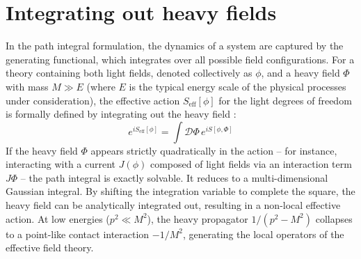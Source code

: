 \section{Integrating out heavy fields}\label{sec:intoutHDOF}
In the path integral formulation, the dynamics of a system are captured by the generating functional, which integrates over all possible field configurations. For a theory containing both light fields, denoted collectively as $\phi$, and a heavy field $\Phi$ with mass $M \gg E$ (where $E$ is the typical energy scale of the physical processes under consideration), the effective action $S_{\text{eff}}[\phi]$ for the light degrees of freedom is formally defined by integrating out the heavy field \cite{Donoghue:1992dd}:
\begin{equation}
    e^{i S_{\text{eff}}[\phi]} = \int \mathcal{D}\Phi \, e^{i S[\phi, \Phi]}
\end{equation}
If the heavy field $\Phi$ appears strictly quadratically in the action -- for instance, interacting with a current $J(\phi)$ composed of light fields via an interaction term $J \Phi$ -- the path integral is exactly solvable. It reduces to a multi-dimensional Gaussian integral. By shifting the integration variable to complete the square, the heavy field can be analytically integrated out, resulting in a non-local effective action. At low energies ($p^2 \ll M^2$), the heavy propagator $1/(p^2 - M^2)$ collapses to a point-like contact interaction $-1/M^2$, generating the local operators of the effective field theory.

